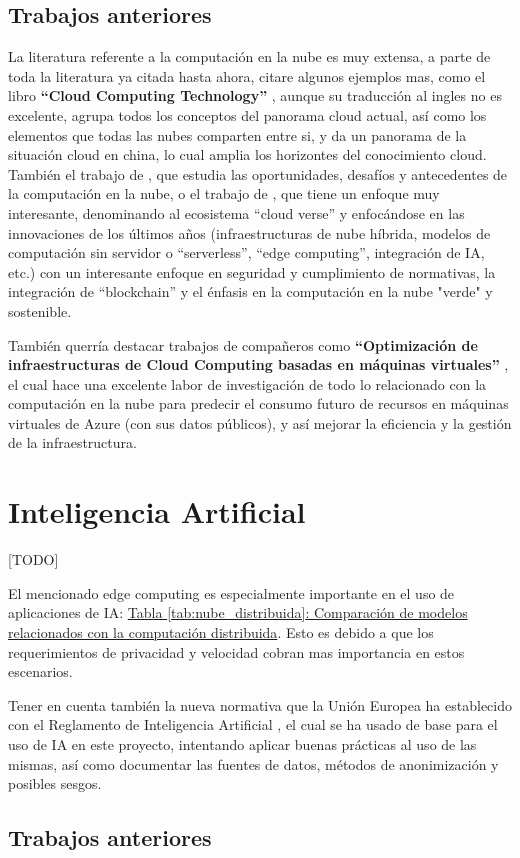 \subsection{Trabajos anteriores}

La literatura referente a la computación en la nube es muy extensa, a parte de toda la literatura ya citada hasta ahora, citare algunos ejemplos mas, como el libro \textbf{``Cloud Computing Technology''} \citep{huawei2023cloud}, aunque su traducción al ingles no es excelente, agrupa todos los conceptos del panorama cloud actual, así como los elementos que todas las nubes comparten entre si, y da un panorama de la situación cloud en china, lo cual amplia los horizontes del conocimiento cloud. También el trabajo de \citep{nigro2022}, que estudia las oportunidades, desafíos y antecedentes de la computación en la nube, o el trabajo de \citep{bommala2024}, que tiene un enfoque muy interesante, denominando al ecosistema ``cloud verse'' y enfocándose en las innovaciones de los últimos años (infraestructuras de nube híbrida, modelos de computación sin servidor o ``serverless'', ``edge computing'', integración de IA, etc.) con un interesante enfoque en seguridad y cumplimiento de normativas, la integración de ``blockchain'' y el énfasis en la computación en la nube "verde" y sostenible. 

También querría destacar trabajos de compañeros como \textbf{``Optimización de infraestructuras de Cloud Computing basadas en máquinas virtuales''} \citep{sanchez2023optimizacion}, el cual hace una excelente labor de investigación de todo lo relacionado con la computación en la nube para predecir el consumo futuro de recursos en máquinas virtuales de Azure (con sus datos públicos), y así mejorar la eficiencia y la gestión de la infraestructura. \newpage

\section{Inteligencia Artificial}
\label{sec:EstudiosIA}

[TODO]


El mencionado edge computing es especialmente importante en el uso de aplicaciones de IA: \hyperref[tab:nube_distribuida]{Tabla \ref*{tab:nube_distribuida}: Comparación de modelos relacionados con la computación distribuida}. Esto es debido a que los requerimientos de privacidad y velocidad cobran mas importancia en estos escenarios.

Tener en cuenta también la nueva normativa que la Unión Europea ha establecido con el Reglamento de Inteligencia Artificial \citep{webRIA2024Europa}, el cual se ha usado de base para el uso de IA en este proyecto, intentando aplicar buenas prácticas al uso de las mismas, así como documentar las fuentes de datos, métodos de anonimización y posibles sesgos.
	
	\subsection{Trabajos anteriores}


